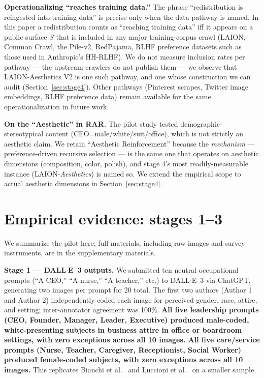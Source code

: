 \documentclass[sigconf,nonacm]{acmart}
\begin{document}
\textbf{Operationalizing ``reaches training data.''} The phrase ``redistribution is reingested into training data'' is precise only when the data pathway is named. In this paper a redistribution counts as ``reaching training data'' iff it appears on a public surface \(S\) that is included in any major training-corpus crawl (LAION, Common Crawl, the Pile-v2, RedPajama, RLHF preference datasets such as those used in Anthropic's HH-RLHF). We do not measure inclusion rates per pathway --- the upstream crawlers do not publish them --- we observe that LAION-Aesthetics V2 is one such pathway, and one whose construction we can audit (Section~\ref{sec:stage4}). Other pathways (Pinterest scrapes, Twitter image embeddings, RLHF preference data) remain available for the same operationalization in future work.

\textbf{On the ``Aesthetic'' in RAR.} The pilot study tested demographic-stereotypical content (CEO=male/white/suit/office), which is not strictly an aesthetic claim. We retain ``Aesthetic Reinforcement'' because the \emph{mechanism} --- preference-driven recursive selection --- is the same one that operates on aesthetic dimensions (composition, color, polish), and stage 4's most readily-measurable instance (LAION-\emph{Aesthetics}) is named so. We extend the empirical scope to actual aesthetic dimensions in Section~\ref{sec:stage4}.

\section{Empirical evidence: stages 1--3}

We summarize the pilot here; full materials, including raw images and survey instruments, are in the supplementary materials.

\textbf{Stage 1 --- DALL$\cdot$E~3 outputs.} We submitted ten neutral occupational prompts (``A CEO,'' ``A nurse,'' ``A teacher,'' etc.) to DALL$\cdot$E~3 via ChatGPT, generating two images per prompt for 20 total. The first two authors (Author 1 and Author 2) independently coded each image for perceived gender, race, attire, and setting; inter-annotator agreement was 100\%. \textbf{All five leadership prompts (CEO, Founder, Manager, Leader, Executive) produced male-coded, white-presenting subjects in business attire in office or boardroom settings, with zero exceptions across all 10 images. All five care/service prompts (Nurse, Teacher, Caregiver, Receptionist, Social Worker) produced female-coded subjects, with zero exceptions across all 10 images.} This replicates Bianchi et al.~\cite{bianchi2023easily} and Luccioni et al.~\cite{luccioni2023stable} on a smaller sample.
\end{document}
